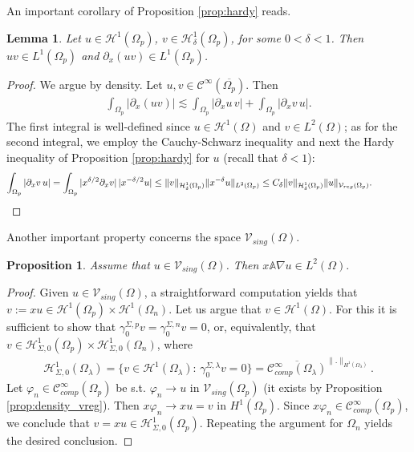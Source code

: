 \documentclass[report]{elsarticle}
\newtheorem{proposition}[theorem]{Proposition}
\newtheorem{lemma}[theorem]{Lemma}
\numberwithin{theorem}{section}
\begin{document}
An important corollary of Proposition \ref{prop:hardy} reads.
\begin{lemma}
	\label{lem:L1}
	Let $u\in \mathcal{H}^1(\Omega_p)$, $v\in \mathcal{H}_{\delta}^1(\Omega_p)$, for some $0<\delta<1$. Then $uv\in L^1(\Omega_p)$ and $\partial_x (uv)\in L^1(\Omega_p)$. 
\end{lemma}
\begin{proof}
	We argue by density. Let $u, v\in \mathcal{C}^{\infty}(\overline{\Omega_p})$. Then 
	\begin{align*}
		\int_{\Omega_p}|\partial_x(uv)|\lesssim \int_{\Omega_p}|\partial_x u \, v|+\int_{\Omega_p}|\partial_x v \, u|.
	\end{align*}
	The first integral is well-defined since $u\in \mathcal{H}^1(\Omega)$ and $v\in L^2(\Omega)$; as for the second integral, we employ the Cauchy-Schwarz inequality and next the Hardy inequality of Proposition \ref{prop:hardy} for $u$ (recall that $\delta<1$):
	\begin{align*}
		\int_{\Omega_p}|\partial_x v \, u|=\int_{\Omega_p}|x^{\delta/2}\partial_x v| \, |x^{-\delta/2}u|\leq \|v\|_{\mathcal{H}^1_{\delta}(\Omega_p)} \|x^{-\delta}u\|_{L^2(\Omega_p)}\leq C_{\delta} \|v\|_{\mathcal{H}^1_{\delta}(\Omega_p)} \|u\|_{\mathcal{V}_{reg}(\Omega_p)}.\qquad\qquad\qedhere
	\end{align*}
\end{proof}
Another important property concerns the space $\mathcal{V}_{sing}(\Omega)$. 
\begin{proposition}
	\label{prop:property2}
	Assume that $u\in \mathcal{V}_{sing}(\Omega)$. Then $
		x\mathbb{A}\nabla u\in L^2(\Omega).
$
\end{proposition}
\begin{proof}
Given $u\in \mathcal{V}_{sing}(\Omega)$, a straightforward computation yields that $v:=xu\in \mathcal{H}^1(\Omega_p)\times \mathcal{H}^1(\Omega_n)$. Let us argue that $v\in \mathcal{H}^1(\Omega)$. For this it is sufficient to show that $\gamma_0^{\Sigma,p}v=\gamma_0^{\Sigma,n}v=0$, or, equivalently, that $v\in \mathcal{H}^1_{\Sigma,0}(\Omega_p)\times \mathcal{H}^1_{\Sigma,0}(\Omega_n)$, where
\begin{align*}
	\mathcal{H}^1_{\Sigma,0}(\Omega_{\lambda})=\{v\in \mathcal{H}^1(\Omega_{\lambda}): \, \gamma_0^{\Sigma,\lambda}v=0\}=\overline{\mathcal{C}^{\infty}_{comp}(\Omega_{\lambda})}^{\|.\|_{H^1(\Omega_{\lambda})}}.
\end{align*} 
Let $\varphi_n\in \mathcal{C}^{\infty}_{comp}(\Omega_p)$ be s.t. $\varphi_n\rightarrow u$ in $\mathcal{V}_{sing}(\Omega_p)$ (it exists by Proposition \ref{prop:density_vreg}). Then $x\varphi_n\rightarrow xu=v$ in $H^1(\Omega_p)$. Since $x\varphi_n\in \mathcal{C}^{\infty}_{comp}(\Omega_p)$, we conclude that $v=xu\in \mathcal{H}^1_{\Sigma,0}(\Omega_p)$. Repeating the argument for $\Omega_n$ yields the desired conclusion.
\end{proof}
\end{document}

